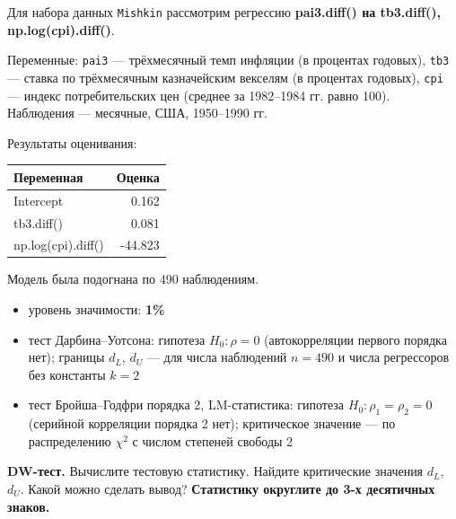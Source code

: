 \documentclass[
  russian,
]{article}
\newcounter{none} %
\providecommand{\tightlist}{%
  \setlength{\itemsep}{0pt}\setlength{\parskip}{0pt}}
\begin{document}
Для набора данных \texttt{Mishkin} рассмотрим регрессию
\textbf{pai3.diff() на tb3.diff(), np.log(cpi).diff()}.

Переменные: \texttt{pai3} --- трёхмесячный темп инфляции (в процентах
годовых), \texttt{tb3} --- ставка по трёхмесячным казначейским векселям
(в процентах годовых), \texttt{cpi} --- индекс потребительских цен
(среднее за 1982--1984 гг. равно 100). Наблюдения --- месячные, США,
1950--1990 гг.

Результаты оценивания:

{\def\LTcaptype{none} %
\begin{longtable}[]{@{}lr@{}}
\toprule\noalign{}
Переменная & Оценка \\
\midrule\noalign{}
\endhead
\bottomrule\noalign{}
\endlastfoot
Intercept & 0.162 \\
tb3.diff() & 0.081 \\
np.log(cpi).diff() & -44.823 \\
\end{longtable}
}

Модель была подогнана по 490 наблюдениям.

\begin{tcolorbox}[enhanced jigsaw, arc=.35mm, bottomrule=.15mm, bottomtitle=1mm, breakable, colback=white, colbacktitle=quarto-callout-important-color!10!white, colframe=quarto-callout-important-color-frame, coltitle=black, left=2mm, leftrule=.75mm, opacityback=0, opacitybacktitle=0.6, rightrule=.15mm, title=\textcolor{quarto-callout-important-color}{\faExclamation}\hspace{0.5em}{Условия теста}, titlerule=0mm, toprule=.15mm, toptitle=1mm]

\begin{itemize}
\tightlist
\item
  уровень значимости: \textbf{1\%}
\item
  тест Дарбина--Уотсона: гипотеза \(H_0:\rho=0\) (автокорреляции первого
  порядка нет); границы \(d_L\), \(d_U\) --- для числа наблюдений
  \(n=490\) и числа регрессоров без константы \(k=2\)
\item
  тест Бройша--Годфри порядка 2, LM-статистика: гипотеза
  \(H_0:\rho_1=\rho_2=0\) (серийной корреляции порядка 2 нет);
  критическое значение --- по распределению \(\chi^2\) с числом степеней
  свободы 2
\end{itemize}

\end{tcolorbox}

\textbf{DW-тест.} Вычислите тестовую статистику. Найдите критические
значения \(d_L\), \(d_U\). Какой можно сделать вывод? \textbf{Статистику
округлите до 3-х десятичных знаков.}
\end{document}
